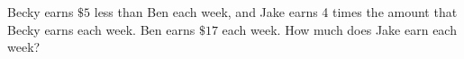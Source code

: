 \begin{exercises}
\begin{questions}
            \begin{solutionordottedlines}[2in]
            \end{solutionordottedlines}
        \Question[3] Becky earns \(\$ 5\) less than Ben each week, and Jake earns 4 times the amount that Becky earns each week. Ben earns \(\$ 17\) each week. How much does Jake earn each week?
            \begin{solutionordottedlines}[2in]
            \end{solutionordottedlines}
    \end{questions}
\end{exercises}
